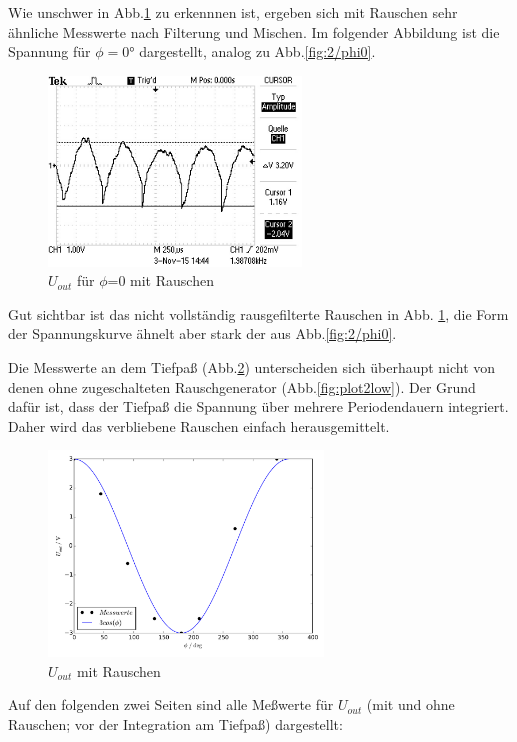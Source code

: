 Wie unschwer in Abb.\ref{fig:3/phi0} zu erkennnen ist, ergeben sich mit Rauschen
sehr ähnliche
Messwerte nach Filterung und Mischen. Im folgender Abbildung ist die
Spannung für $\phi=0°$ dargestellt, analog zu Abb.\ref{fig:2/phi0}.

\begin{figure}[H]
  \centering
  \includegraphics[angle=90,width=0.6\textwidth, height=0.3\textwidth]{graphics/ALL0039/F0039TEK.jpg}
  \caption{$U_{out}$ für $\phi$=0 mit Rauschen}
  \label{fig:3/phi0}
\end{figure}

Gut sichtbar ist das nicht vollständig rausgefilterte Rauschen in Abb.
\ref{fig:3/phi0}, die Form der
Spannungskurve ähnelt aber stark der aus Abb.\ref{fig:2/phi0}.




Die Messwerte an dem Tiefpaß (Abb.\ref{fig:plot3low}) unterscheiden sich
überhaupt nicht von denen ohne zugeschalteten
Rauschgenerator (Abb.\ref{fig:plot2low}).
Der Grund dafür ist, dass der Tiefpaß die Spannung über mehrere
Periodendauern integriert. Daher wird das verbliebene Rauschen einfach
herausgemittelt.
\begin{figure}[H]
  \centering
  \includegraphics[width=0.65\textwidth, height=0.35\textwidth]{plot3low.pdf}
  \caption{$U_{out}$ mit Rauschen}
  \label{fig:plot3low}
\end{figure}
Auf den folgenden zwei Seiten sind alle Meßwerte für $U_{out}$
(mit und ohne Rauschen; vor der Integration am Tiefpaß) dargestellt:

